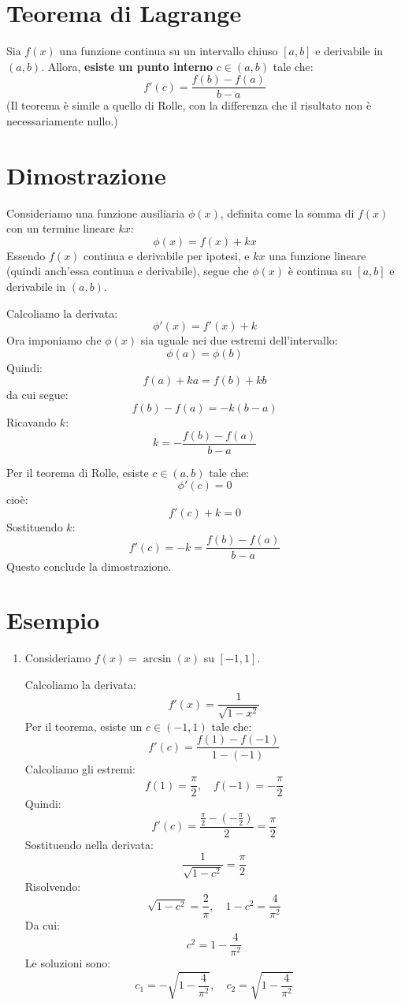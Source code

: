\documentclass[12pt]{article}
\begin{document}
\Huge

\section*{Teorema di Lagrange}

Sia \( f(x) \) una funzione continua su un intervallo chiuso \([a, b]\) e derivabile in \((a, b)\).  
Allora, \textbf{esiste un punto interno} \( c \in (a, b) \) tale che:
\[
f'(c) = \frac{f(b) - f(a)}{b - a}
\]
(Il teorema è simile a quello di Rolle, con la differenza che il risultato non è necessariamente nullo.)

\vspace{0.8cm}

\section*{Dimostrazione}

Consideriamo una funzione ausiliaria \( \phi(x) \), definita come la somma di \( f(x) \) con un termine lineare \( kx \):
\[
\phi(x) = f(x) + kx
\]
Essendo \( f(x) \) continua e derivabile per ipotesi, e \( kx \) una funzione lineare (quindi anch'essa continua e derivabile), segue che \( \phi(x) \) è continua su \([a, b]\) e derivabile in \((a, b)\).

Calcoliamo la derivata:
\[
\phi'(x) = f'(x) + k
\]
Ora imponiamo che \( \phi(x) \) sia uguale nei due estremi dell'intervallo:
\[
\phi(a) = \phi(b)
\]
Quindi:
\[
f(a) + ka = f(b) + kb
\]
da cui segue:
\[
f(b) - f(a) = -k(b - a)
\]
Ricavando \( k \):
\[
k = -\frac{f(b) - f(a)}{b - a}
\]

Per il teorema di Rolle, esiste \( c \in (a, b) \) tale che:
\[
\phi'(c) = 0
\]
cioè:
\[
f'(c) + k = 0
\]
Sostituendo \( k \):
\[
f'(c) = -k = \frac{f(b) - f(a)}{b - a}
\]
Questo conclude la dimostrazione.

\vspace{0.8cm}

\section*{Esempio}

\begin{enumerate}
    \item Consideriamo \( f(x) = \arcsin(x) \) su \([-1, 1]\).

    Calcoliamo la derivata:
    \[
    f'(x) = \frac{1}{\sqrt{1 - x^2}}
    \]
    Per il teorema, esiste un \( c \in (-1, 1) \) tale che:
    \[
    f'(c) = \frac{f(1) - f(-1)}{1 - (-1)}
    \]
    Calcoliamo gli estremi:
    \[
    f(1) = \frac{\pi}{2}, \quad f(-1) = -\frac{\pi}{2}
    \]
    Quindi:
    \[
    f'(c) = \frac{\frac{\pi}{2} - \left(-\frac{\pi}{2}\right)}{2} = \frac{\pi}{2}
    \]
    Sostituendo nella derivata:
    \[
    \frac{1}{\sqrt{1 - c^2}} = \frac{\pi}{2}
    \]
    Risolvendo:
    \[
    \sqrt{1 - c^2} = \frac{2}{\pi}, \quad 1 - c^2 = \frac{4}{\pi^2}
    \]
    Da cui:
    \[
    c^2 = 1 - \frac{4}{\pi^2}
    \]
    Le soluzioni sono:
    \[
    c_1 = -\sqrt{1 - \frac{4}{\pi^2}}, \quad c_2 = \sqrt{1 - \frac{4}{\pi^2}}
    \]
\end{enumerate}
\end{document}
